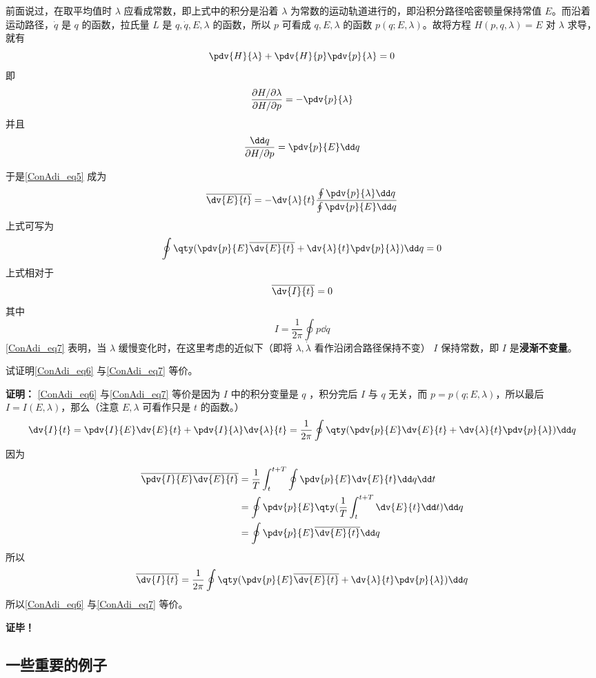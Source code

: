 前面说过，在取平均值时 $\lambda$ 应看成常数，即上式中的积分是沿着 $\lambda$ 为常数的运动轨道进行的，即沿积分路径哈密顿量保持常值 $E$。而沿着运动路径，$\dot q$ 是 $q$ 的函数，拉氏量 $L$ 是 $q,\dot q,E,\lambda$ 的函数，所以 $p$ 可看成 $q,E,\lambda$ 的函数 $p(q;E,\lambda)$。故将方程 $H(p,q,\lambda)=E$ 对 $\lambda$ 求导，就有
\begin{equation}
\pdv{H}{\lambda}+\pdv{H}{p}\pdv{p}{\lambda}=0
\end{equation}
即 
\begin{equation}
\frac{\partial{H}/\partial{\lambda}}{\partial{H}/\partial{p}}=-\pdv{p}{\lambda}
\end{equation}
并且
\begin{equation}
\frac{\dd q}{\partial{H}/\partial{p}}=\pdv{p}{E}\dd q
\end{equation}

于是\autoref{ConAdi_eq5} 成为
\begin{equation}
\overline{\dv{E}{t}}=-\dv{\lambda}{t}
\frac{\oint\pdv{p}{\lambda}\dd q}
{\oint\pdv{p}{E}\dd q}
\end{equation}
上式可写为
\begin{equation}\label{ConAdi_eq6}
\oint\qty(\pdv{p}{E}\overline{\dv{E}{t}}+\dv{\lambda}{t}\pdv{p}{\lambda})\dd q=0
\end{equation}
上式相对于
\begin{equation}\label{ConAdi_eq7}
\overline{\dv{I}{t}}=0
\end{equation}
其中
\begin{equation}
I=\frac{1}{2\pi}\oint p\dd q
\end{equation}
 \autoref{ConAdi_eq7} 表明，当 $\lambda$ 缓慢变化时，在这里考虑的近似下（即将 $\lambda,\dot\lambda$ 看作沿闭合路径保持不变） $I$ 保持常数，即 $I$ 是\textbf{浸渐不变量}。
\begin{exercise}{}
试证明\autoref{ConAdi_eq6} 与\autoref{ConAdi_eq7} 等价。

\textbf{证明：}
\autoref{ConAdi_eq6} 与\autoref{ConAdi_eq7} 等价是因为 $I$ 中的积分变量是 $q$ ，积分完后 $I$ 与 $q$ 无关，而 $p=p(q;E,\lambda)$，所以最后 $I=I(E,\lambda)$，那么（注意 $E,\lambda$ 可看作只是 $t$ 的函数。）
\begin{equation}
\dv{I}{t}=\pdv{I}{E}\dv{E}{t}+\pdv{I}{\lambda}\dv{\lambda}{t}=\frac{1}{2\pi}\oint\qty(\pdv{p}{E}\dv{E}{t}+\dv{\lambda}{t}\pdv{p}{\lambda})\dd q
\end{equation}
因为
  \begin{equation}
  \begin{aligned}
\overline{\pdv{I}{E}\dv{E}{t}}&=\frac{1}{T}\int_t^{t+T}\oint\pdv{p}{E}\dv{E}{t}\dd q\dd t\\
&=\oint\pdv{p}{E}\qty(\frac{1}{T}\int_t^{t+T}\dv{E}{t}\dd t)\dd q\\
&=\oint\pdv{p}{E}\overline{\dv{E}{t}}\dd q
\end{aligned}
\end{equation}
所以
\begin{equation}
\overline{\dv{I}{t}}=\frac{1}{2\pi}\oint\qty(\pdv{p}{E}\overline{\dv{E}{t}}+\dv{\lambda}{t}\pdv{p}{\lambda})\dd q
\end{equation}
所以\autoref{ConAdi_eq6} 与\autoref{ConAdi_eq7} 等价。

\textbf{证毕！}
\end{exercise}
 \subsection{一些重要的例子}